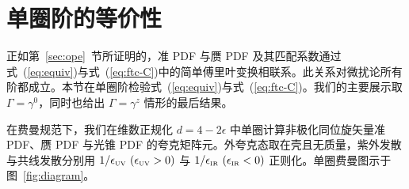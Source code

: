 \section{单圈阶的等价性}
\label{sec:equiv}

正如第~\ref{sec:ope}~节所证明的，准 PDF 与赝 PDF 及其匹配系数通过式~(\ref{eq:equiv})与式~(\ref{eq:ftc-C})中的简单傅里叶变换相联系。此关系对微扰论所有阶都成立。本节在单圈阶检验式~(\ref{eq:equiv})与式~(\ref{eq:ftc-C})。我们的主要展示取 $\Gamma=\gamma^0$，同时也给出 $\Gamma=\gamma^z$ 情形的最后结果。

在费曼规范下，我们在维数正规化 $d=4-2\epsilon$ 中单圈计算非极化同位旋矢量准 PDF、赝 PDF 与光锥 PDF 的夸克矩阵元。外夸克态取在壳且无质量，紫外发散与共线发散分别用 $1/\epsilon_{\mbox{\tiny UV}}\ (\epsilon_{\mbox{\tiny UV}}>0)$ 与 $1/\epsilon_{\mbox{\tiny IR}}\ (\epsilon_{\mbox{\tiny IR}}<0)$ 正则化。单圈费曼图示于图~\ref{fig:diagram}。


